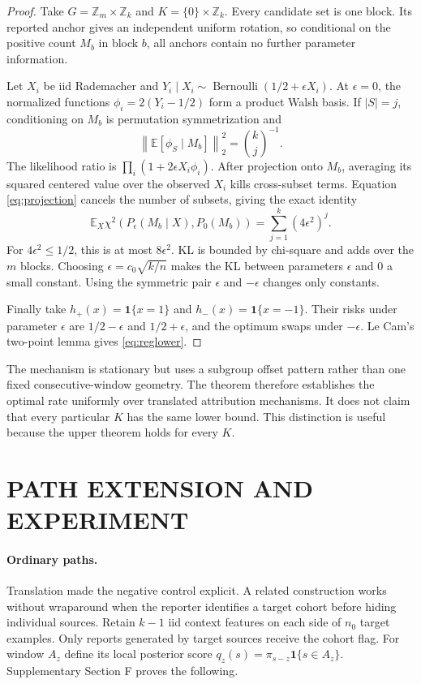 \documentclass[twoside]{article}
\newcommand{\E}{\mathbb E}
\newcommand{\1}{\mathbf 1}
\newcommand{\Bern}{\operatorname{Bernoulli}}
\begin{document}
\begin{proof}
Take $G=\mathbb Z_m\times\mathbb Z_k$ and $K=\{0\}\times\mathbb Z_k$. Every candidate set is one block. Its reported anchor gives an independent uniform rotation, so conditional on the positive count $M_b$ in block $b$, all anchors contain no further parameter information.

Let $X_i$ be iid Rademacher and $Y_i\mid X_i\sim\Bern(1/2+\epsilon X_i)$. At $\epsilon=0$, the normalized functions $\phi_i=2(Y_i-1/2)$ form a product Walsh basis. If $|S|=j$, conditioning on $M_b$ is permutation symmetrization and
\begin{equation}
 \left\|\E[\phi_S\mid M_b]\right\|_2^2={k\choose j}^{-1}.
 \label{eq:projection}
\end{equation}
The likelihood ratio is $\prod_i(1+2\epsilon X_i\phi_i)$. After projection onto $M_b$, averaging its squared centered value over the observed $X_i$ kills cross-subset terms. Equation \eqref{eq:projection} cancels the number of subsets, giving the exact identity
\begin{equation}
 \E_X\chi^2(P_\epsilon(M_b\mid X),P_0(M_b))
 =\sum_{j=1}^k(4\epsilon^2)^j.
 \label{eq:chisquare}
\end{equation}
For $4\epsilon^2\le1/2$, this is at most $8\epsilon^2$. KL is bounded by chi-square and adds over the $m$ blocks. Choosing $\epsilon=c_0\sqrt{k/n}$ makes the KL between parameters $\epsilon$ and $0$ a small constant. Using the symmetric pair $\epsilon$ and $-\epsilon$ changes only constants.

Finally take $h_+(x)=\1\{x=1\}$ and $h_-(x)=\1\{x=-1\}$. Their risks under parameter $\epsilon$ are $1/2-\epsilon$ and $1/2+\epsilon$, and the optimum swaps under $-\epsilon$. Le Cam's two-point lemma gives \eqref{eq:reglower}.
\end{proof}

The mechanism is stationary but uses a subgroup offset pattern rather than one fixed consecutive-window geometry. The theorem therefore establishes the optimal rate uniformly over translated attribution mechanisms. It does not claim that every particular $K$ has the same lower bound. This distinction is useful because the upper theorem holds for every $K$.

\section{PATH EXTENSION AND EXPERIMENT}

\paragraph{Ordinary paths.}
Translation made the negative control explicit. A related construction works without wraparound when the reporter identifies a target cohort before hiding individual sources. Retain $k-1$ iid context features on each side of $n_0$ target examples. Only reports generated by target sources receive the cohort flag. For window $A_z$ define its local posterior score $q_z(s)=\pi_{s-z}\1\{s\in A_z\}$. Supplementary Section F proves the following.
\end{document}
